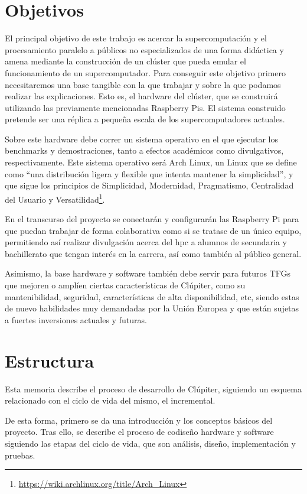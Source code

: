 \section{Objetivos}
\label{sec:objetivos}

El principal objetivo de este trabajo es acercar la supercomputación y el procesamiento paralelo a públicos no especializados de una forma didáctica y amena mediante la construcción de un clúster que pueda emular el funcionamiento de un supercomputador. Para conseguir este objetivo primero necesitaremos una base tangible con la que trabajar y sobre la que podamos realizar las explicaciones. Esto es, el hardware del clúster, que se construirá utilizando las previamente mencionadas Raspberry Pis. El sistema construido pretende ser una réplica a pequeña escala de los supercomputadores actuales.

Sobre este hardware debe correr un sistema operativo en el que ejecutar los benchmarks y demostraciones, tanto a efectos académicos como divulgativos, respectivamente. Este sistema operativo será Arch Linux, un Linux que se define como ``una distribución ligera y flexible que intenta mantener la simplicidad'', y que sigue los principios de Simplicidad, Modernidad, Pragmatismo, Centralidad del Usuario y Versatilidad\footnote{\url{https://wiki.archlinux.org/title/Arch\_Linux}}.

En el transcurso del proyecto se conectarán y configurarán las Raspberry Pi para que puedan trabajar de forma colaborativa como si se tratase de un único equipo, permitiendo así realizar divulgación acerca del \acrshort{hpc} a alumnos de secundaria y bachillerato que tengan interés en la carrera, así como también al público general.

Asimismo, la base hardware y software también debe servir para futuros TFGs que mejoren o amplíen ciertas características de Clúpiter, como su mantenibilidad, seguridad, características de alta disponibilidad, etc, siendo estas de nuevo habilidades muy demandadas por la Unión Europea y que están sujetas a fuertes inversiones actuales y futuras.



\section{Estructura}
\label{sec:estructura}
Esta memoria describe el proceso de desarrollo de Clúpiter, siguiendo un esquema relacionado con el ciclo de vida del mismo, el incremental.

De esta forma, primero se da una introducción y los conceptos básicos del proyecto. Tras ello, se describe el proceso de codiseño hardware y software siguiendo las etapas del ciclo de vida, que son análisis, diseño, implementación y pruebas.

